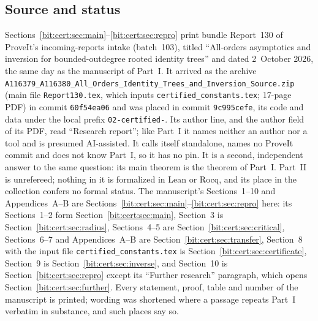 \documentclass[11pt]{article}
\theoremstyle{definition}\newtheorem{definition}[theorem]{Definition}
\theoremstyle{remark}\newtheorem{remark}[theorem]{Remark}
\begin{document}
\subsection{Source and status}\label{bit:cert:sec:source}
Sections~\ref{bit:cert:sec:main}--\ref{bit:cert:sec:repro} print bundle
Report~130 of ProveIt's incoming-reports intake (batch~103), titled
``All-orders asymptotics and inversion for bounded-outdegree rooted identity
trees'' and dated 2~October 2026, the same day as the manuscript of Part~I.
It arrived as the archive
\texttt{A116379\_\allowbreak A116380\_\allowbreak All\_\allowbreak Orders\_\allowbreak Identity\_\allowbreak Trees\_\allowbreak and\_\allowbreak Inversion\_\allowbreak Source.zip}
(main file \texttt{Report130.tex}, which inputs
\texttt{certified\_\allowbreak constants.tex}; 17-page PDF) in commit
\texttt{60f54ea06} and was placed in commit \texttt{9c995cefe}, its code and
data under the local prefix \texttt{02-certified-}. Its author line, and the
author field of its PDF, read ``Research report''; like Part~I it names
neither an author nor a tool and is presumed AI-assisted. It calls itself
standalone, names no ProveIt commit and does not know Part~I, so it has no
pin. It is a second, independent answer to the same question: its main
theorem is the theorem of Part~I. Part~II is unrefereed; nothing in it is
formalized in Lean or Rocq, and its place in the collection confers no formal
status. The manuscript's Sections~1--10 and Appendices~A--B are
Sections~\ref{bit:cert:sec:main}--\ref{bit:cert:sec:repro} here: its
Sections~1--2 form Section~\ref{bit:cert:sec:main}, Section~3 is
Section~\ref{bit:cert:sec:radius}, Sections~4--5 are
Section~\ref{bit:cert:sec:critical}, Sections~6--7 and Appendices~A--B are
Section~\ref{bit:cert:sec:transfer}, Section~8 with the input file
\texttt{certified\_\allowbreak constants.tex} is
Section~\ref{bit:cert:sec:certificate}, Section~9 is
Section~\ref{bit:cert:sec:inverse}, and Section~10 is
Section~\ref{bit:cert:sec:repro} except its ``Further research'' paragraph,
which opens Section~\ref{bit:cert:sec:further}.
Every statement, proof, table and number of the manuscript is printed;
wording was shortened where a passage repeats Part~I verbatim in substance,
and such places say so.
\end{document}
